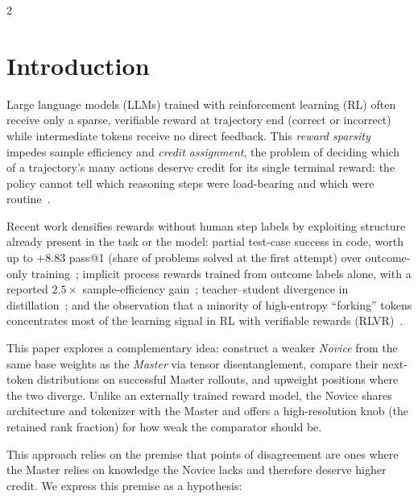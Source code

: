 \documentclass[9pt]{article}
\begin{document}
\begin{multicols}{2}
\raggedcolumns



\section{Introduction}

Large language models (LLMs) trained with reinforcement learning (RL) often receive
only a sparse, verifiable reward at trajectory end (correct or
incorrect) while intermediate tokens receive no direct feedback. This
\emph{reward sparsity} impedes sample efficiency and \emph{credit
assignment}, the problem of deciding which of a trajectory's many actions
deserve credit for its single terminal reward: the policy cannot tell which
reasoning steps were load-bearing and which were
routine~\citep{cui2025prime}.

Recent work densifies rewards without human step labels by exploiting structure
already present in the task or the model: partial test-case success in code,
worth up to $+8.83$ pass@1 (share of problems solved at the first attempt)
over outcome-only training~\citep{wang2026verpo};
implicit process rewards trained from outcome labels alone, with a reported
$2.5\times$ sample-efficiency gain~\citep{cui2025prime}; teacher--student
divergence in distillation~\citep{xu2026tip}; and the observation that a
minority of high-entropy ``forking'' tokens concentrates most of the
learning signal in RL with verifiable rewards
(RLVR)~\citep{wang2025forking}.

This paper explores a complementary idea: construct a weaker \emph{Novice} from
the same base weights as the \emph{Master} via tensor disentanglement, compare
their next-token distributions on successful Master rollouts, and upweight
positions where the two diverge. Unlike an
externally trained reward model, the Novice shares architecture and tokenizer
with the Master and offers a high-resolution knob (the retained rank fraction) for
how weak the comparator should be.

This approach relies on the premise that points of disagreement are ones where
the Master relies on knowledge the Novice lacks and therefore deserve higher
credit. We express this premise as a hypothesis:


\end{multicols}
\end{document}
